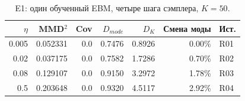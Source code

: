 \begin{table}[H]\centering\small
\setlength{\tabcolsep}{4pt}
\caption{E1: один обученный EBM, четыре шага сэмплера, $K=50$.}\label{tab:eta}
\begin{tabular}{rrrrrrl}
\toprule
$\eta$ & MMD$^2$ & Cov & $D_{mode}$ & $D_K$ & Смена моды & Ист. \\
\midrule
0.005 & 0.052331 & 0.0 & 0.7476 & 0.8926 & 0.00\% & R01 \\
0.02 & 0.037175 & 0.0 & 0.7582 & 1.7286 & 0.70\% & R02 \\
0.08 & 0.129107 & 0.0 & 0.9150 & 3.2972 & 1.78\% & R03 \\
0.5 & 0.203648 & 0.0 & 0.9320 & 4.5117 & 2.92\% & R04 \\
\bottomrule
\end{tabular}
\end{table}
